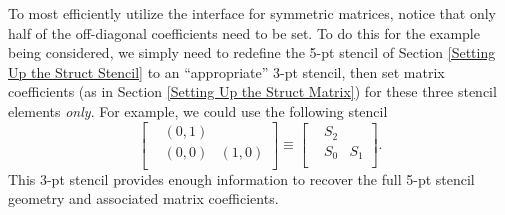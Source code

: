 To most efficiently utilize the  interface for symmetric
matrices, notice that only half of the off-diagonal coefficients need
to be set.  To do this for the example being considered, we simply
need to redefine the 5-pt stencil of Section
\ref{Setting Up the Struct Stencil} to an ``appropriate'' 3-pt stencil, then
set matrix coefficients (as in Section \ref{Setting Up the Struct Matrix})
for these three stencil elements {\em only}.  For example, we could
use the following stencil
\begin{equation}\label{eqn-symmetric-stencil}
\left [
\begin{array}{ccc}
 & ( 0, 1) &         \\
 & ( 0, 0) & ( 1, 0) \\
 &         &        
\end{array}
\right ]
\equiv
\left [
\begin{array}{ccc}
 & S_2 &     \\
 & S_0 & S_1 \\
 &     &    
\end{array}
\right ] .
\end{equation}
This 3-pt stencil provides enough information to recover the full 5-pt
stencil geometry and associated matrix coefficients.

